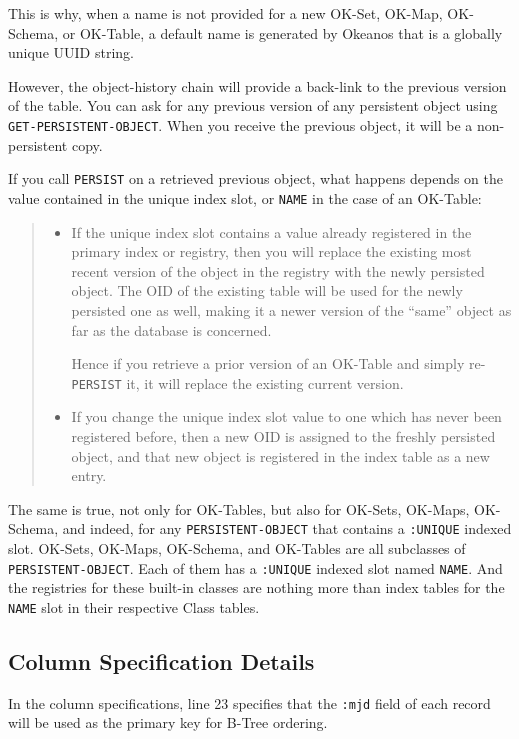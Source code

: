\documentclass[article,oneside]{memoir}
\begin{document}
This is why, when a name is not provided for a new OK-Set, OK-Map, OK-Schema, or OK-Table, a default name is generated by Okeanos that is a globally unique UUID string.

However, the object-history chain will provide a back-link to the previous version of the table. You can ask for any previous version of any persistent object using \texttt{GET-PERSISTENT-OBJECT}. When you receive the previous object, it will be a non-persistent copy. 

If you call \texttt{PERSIST} on a retrieved previous object, what happens depends on the value contained in the unique index slot, or \texttt{NAME} in the case of an OK-Table:

\begin{quote}
\begin{itemize}
\item If the unique index slot contains a value already registered in the primary index or registry, then you will replace the existing most recent version of the object in the registry with the newly persisted object. The OID of the existing table will be used for the newly persisted one as well, making it a newer version of the ``same'' object as far as the database is concerned. 

Hence if you retrieve a prior version of an OK-Table and simply re-\texttt{PERSIST} it, it will replace the existing current version.

\item If you change the unique index slot value to one which has never been registered before, then a new OID is assigned to the freshly persisted object, and that new object is registered in the index table as a new entry.
\end{itemize}
\end{quote}

The same is true, not only for OK-Tables, but also for OK-Sets, OK-Maps, OK-Schema, and indeed, for any \texttt{PERSISTENT-OBJECT} that contains a \texttt{:UNIQUE} indexed slot. OK-Sets, OK-Maps, OK-Schema, and OK-Tables are all subclasses of \texttt{PERSISTENT-OBJECT}. Each of them has a \texttt{:UNIQUE} indexed slot named \texttt{NAME}. And the registries for these built-in classes are nothing more than index tables for the \texttt{NAME} slot in their respective Class tables.

\subsection{Column Specification Details}
In the column specifications, line 23 specifies that the \texttt{:mjd} field of each record will be used as the primary key for B-Tree ordering.
\end{document}
